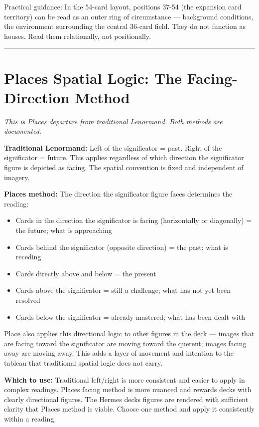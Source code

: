 Practical guidance: In the 54-card layout, positions 37-54 (the expansion card territory) can be read as an outer ring of circumstance --- background conditions, the environment surrounding the central 36-card field. They do not function as houses. Read them relationally, not positionally.

\begin{center}\rule{0.5\linewidth}{0.5pt}\end{center}

\section{Place\textquotesingle s Spatial Logic: The Facing-Direction Method}\label{places-spatial-logic-the-facing-direction-method}

\emph{This is Place\textquotesingle s departure from traditional Lenormand. Both methods are documented.}

\textbf{Traditional Lenormand:} Left of the significator = past. Right of the significator = future. This applies regardless of which direction the significator figure is depicted as facing. The spatial convention is fixed and independent of imagery.

\textbf{Place\textquotesingle s method:} The direction the significator figure faces determines the reading:

\begin{itemize}
\tightlist
\item
  Cards in the direction the significator is facing (horizontally or diagonally) = the future; what is approaching
\item
  Cards behind the significator (opposite direction) = the past; what is receding
\item
  Cards directly above and below = the present
\item
  Cards above the significator = still a challenge; what has not yet been resolved
\item
  Cards below the significator = already mastered; what has been dealt with
\end{itemize}

Place also applies this directional logic to other figures in the deck --- images that are facing toward the significator are moving toward the querent; images facing away are moving away. This adds a layer of movement and intention to the tableau that traditional spatial logic does not carry.

\textbf{Which to use:} Traditional left/right is more consistent and easier to apply in complex readings. Place\textquotesingle s facing method is more nuanced and rewards decks with clearly directional figures. The Hermes deck\textquotesingle s figures are rendered with sufficient clarity that Place\textquotesingle s method is viable. Choose one method and apply it consistently within a reading.
